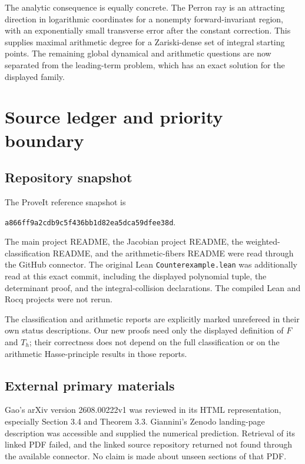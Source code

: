 \documentclass[11pt,a4paper]{article}
\numberwithin{equation}{section}
\theoremstyle{definition}
\theoremstyle{remark}
\begin{document}
The analytic consequence is equally concrete. The Perron ray is
an attracting direction in logarithmic coordinates for a
nonempty forward-invariant region, with an exponentially small
transverse error after the constant correction. This supplies
maximal arithmetic degree for a Zariski-dense set of integral
starting points. The remaining global dynamical and arithmetic
questions are now separated from the leading-term problem, which
has an exact solution for the displayed family.

\appendix
\section{Source ledger and priority boundary}\label{kmd:app:sources}

\subsection{Repository snapshot}
The ProveIt reference snapshot is
\begin{center}
\texttt{a866ff9a2cdb9c5f436bb1d82ea5dca59dfee38d}.
\end{center}
The main project README, the Jacobian project README, the
weighted-classification README, and the arithmetic-fibers README
were read through the GitHub connector. The original Lean
\texttt{Counterexample.lean} was additionally read at this exact
commit, including the displayed polynomial tuple, the determinant
proof, and the integral-collision declarations. The compiled Lean
and Rocq projects were not rerun.

The classification and arithmetic reports are explicitly marked
unrefereed in their own status descriptions. Our new proofs need
only the displayed definition of $F$ and $T_h$; their correctness
does not depend on the full classification or on the arithmetic
Hasse-principle results in those reports.

\subsection{External primary materials}
Gao's arXiv version 2608.00222v1 was reviewed in its HTML
representation, especially Section 3.4 and Theorem 3.3. Giannini's
Zenodo landing-page description was accessible and supplied the
numerical prediction. Retrieval of its linked PDF failed, and the
linked source repository returned not found through the available
connector. No claim is made about unseen sections of that PDF.
\end{document}
